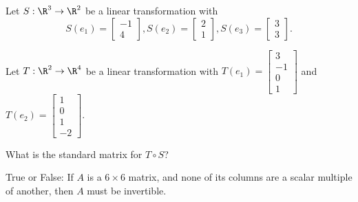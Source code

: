 




\edXsolution{ 
  
}
 
\endedxproblem





Let $S: \R^3 \rightarrow \R^2$ be a linear transformation with 
\[
S(e_1) = \left[ \begin{array}{c} -1 \\ 4  \end{array} \right],
S(e_2) = \left[ \begin{array}{c} 2 \\ 1  \end{array} \right],
S(e_3) = \left[ \begin{array}{c} 3 \\ 3  \end{array} \right]. \]


Let $T: \R^2 \rightarrow \R^4$ be a linear transformation with 
$T(e_1) = \left[ \begin{array}{c} 3 \\ -1 \\ 0 \\ 1 \end{array} \right]$ 
and $T(e_2) = \left[ \begin{array}{c} 1 \\ 0 \\ 1 \\ -2 \end{array} \right].$

What is the standard matrix for $T\circ S$?  
 






\edXsolution{
}


\endedxproblem




True or False: If $A$ is a $6\times 6$ matrix, and none of its columns are a scalar multiple of another,
then $A$ must be invertible.  


